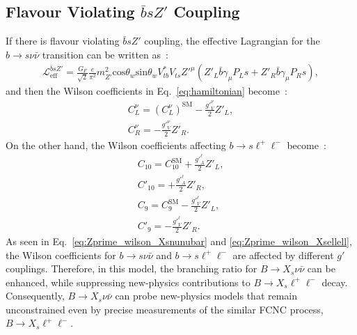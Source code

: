 \subsection{Flavour Violating $\bar{b}sZ'$ Coupling}
\label{sec:Zprime_model}
If there is flavour violating $\bar{b}sZ'$ coupling, the effective Lagrangian for the $b\rightarrow s \nu \bar{\nu}$ transition can be written as~\cite{Altmannshofer:2009ma}:
\begin{align}
  \mathcal{L}_{\textrm{eff}}^{\bar{b}sZ'} = \frac{G_{F}}{\sqrt{2}}\frac{e}{\pi^{2}}m^{2}_{Z'}\textrm{cos}\theta_{w}\textrm{sin}\theta_{w} V_{tb}^{*}V_{ts}Z'^{\mu}(Z'_{L}\bar{b}\gamma_{\mu}P_{L}s+Z'_{R}\bar{b}\gamma_{\mu}P_{R}s),
\end{align}
and then the Wilson coefficients in Eq.~\ref{eq:hamiltonian} become~\cite{Altmannshofer:2009ma}:
\begin{equation}
  \begin{aligned}
    \label{eq:Zprime_wilson_Xsnunubar}
    C_{L}^{\nu} = \left(C_{L}^{\nu} \right)^{\textrm{SM}} - \frac{{g'}_{V}^{\nu}}{2}Z'_{L},\\
    C_{R}^{\nu} = - \frac{{g'}_{V}^{\nu}}{2}Z'_{R}.
  \end{aligned}
\end{equation}
On the other hand, the Wilson coefficients affecting $b\rightarrow s \ell^{+} \ell^{-}$ become~\cite{Altmannshofer:2009ma}:
\begin{equation}
  \begin{aligned}
    \label{eq:Zprime_wilson_Xsellell}
    C_{10} = C_{10}^{\textrm{SM}} + \frac{{g'}_{A}^{\ell}}{2}Z'_{L},\\
    C'_{10} = +\frac{{g'}_{A}^{\ell}}{2}Z'_{R},\\
    C_{9} = C_{9}^{\textrm{SM}} - \frac{{g'}_{V}^{\ell}}{2}Z'_{L},\\
    C'_{9} = -\frac{{g'}_{V}^{\ell}}{2}Z'_{R}.
  \end{aligned}
\end{equation}
As seen in Eq.~\ref{eq:Zprime_wilson_Xsnunubar} and \ref{eq:Zprime_wilson_Xsellell}, the Wilson coefficients for $b\rightarrow s \nu \bar{\nu}$ and $b\rightarrow s \ell^{+} \ell^{-}$ are affected by different $g'$ couplings.
Therefore, in this model, the branching ratio for $B\rightarrow X_{s} \nu \bar{\nu}$ can be enhanced, while suppressing new-physics contributions to $B\rightarrow X_{s} \ell^{+} \ell^{-}$ decay.
Consequently, $B\rightarrow X_{s} \nu \bar{\nu}$ can probe new-physics models that remain unconstrained even by precise measurements of the similar FCNC process, $B\rightarrow X_{s} \ell^{+} \ell^{-}$.

